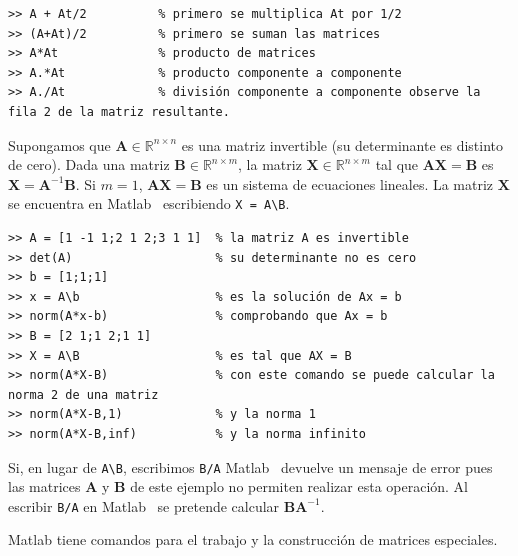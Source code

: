 \documentclass[letter,11pt]{article}
\newcommand\R{\mathbb{R}}
\newcommand\0{\mathbf{0}}
\newcommand{\matlab}{{\sc Matlab }}
\begin{document}
\begin{lstlisting}
>> A + At/2          % primero se multiplica At por 1/2
>> (A+At)/2          % primero se suman las matrices
>> A*At              % producto de matrices
>> A.*At             % producto componente a componente
>> A./At             % división componente a componente observe la fila 2 de la matriz resultante.
\end{lstlisting}

\medskip
	
	Supongamos que $\boldsymbol{A} \in \R^{n\times n}$ es una matriz invertible (su determinante
	es distinto de cero). Dada una matriz $\boldsymbol{B} \in \R^{n\times m}$,
	la matriz $\boldsymbol{X} \in \R^{n\times m}$
	tal que $\boldsymbol{AX} = \boldsymbol{B}$ es $\boldsymbol{X} = \boldsymbol{A}^{-1}\boldsymbol{B}$. Si $m = 1$, $\boldsymbol{AX} = \boldsymbol{B}$ es
	un sistema de ecuaciones lineales.
	La matriz $\boldsymbol{X}$ se encuentra en \matlab\, escribiendo \Verb+X = A\B+.
	
    \medskip

\begin{lstlisting}
>> A = [1 -1 1;2 1 2;3 1 1]  % la matriz A es invertible
>> det(A)                    % su determinante no es cero
>> b = [1;1;1]
>> x = A\b                   % es la solución de Ax = b
>> norm(A*x-b)               % comprobando que Ax = b
>> B = [2 1;1 2;1 1]
>> X = A\B                   % es tal que AX = B
>> norm(A*X-B)               % con este comando se puede calcular la norma 2 de una matriz
>> norm(A*X-B,1)             % y la norma 1
>> norm(A*X-B,inf)           % y la norma infinito
\end{lstlisting}				
	
	\medskip

	Si, en lugar de \Verb+A\B+, escribimos \Verb+B/A+ \matlab\, devuelve un mensaje
	de error pues las matrices $\boldsymbol{A}$ y $\boldsymbol{B}$ de este ejemplo no permiten
	realizar esta operaci\'on. Al escribir
	\Verb+B/A+ en \matlab\, se pretende calcular $\boldsymbol{BA}^{-1}$.

\medskip

\matlab{} tiene comandos para el trabajo y la construcci\'on de matrices especiales.

\medskip
\end{document}
